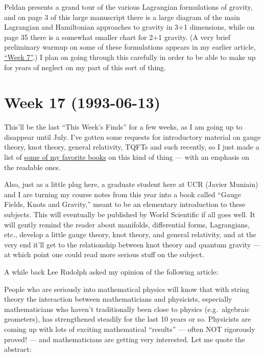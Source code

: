 \documentclass{article}
\def\tightlist{}
\renewcommand{\texttt}[1]{%
  \begingroup
  \ttfamily
  \begingroup\lccode`~=`/\lowercase{\endgroup\def~}{/\discretionary{}{}{}}%
  \begingroup\lccode`~=`[\lowercase{\endgroup\def~}{[\discretionary{}{}{}}%
  \begingroup\lccode`~=`.\lowercase{\endgroup\def~}{.\discretionary{}{}{}}%
  \catcode`/=\active\catcode`[=\active\catcode`.=\active
  \scantokens{#1\noexpand}%
  \endgroup
}
\begin{document}
Peldan presents a grand tour of the various Lagrangian formulations of
gravity, and on page 3 of this large manuscript there is a large diagram
of the main Lagrangian and Hamiltonian approaches to gravity in 3+1
dimensions, while on page 35 there is a somewhat smaller chart for 2+1
gravity. (A very brief preliminary warmup on some of these formulations
appears in my earlier article, \protect\hyperlink{week7}{``Week 7''}.) I
plan on going through this carefully in order to be able to make up for
years of neglect on my part of this sort of thing.
\hypertarget{week17}{%
\section{Week 17 (1993-06-13)}\label{week17}}

This'll be the last ``This Week's Finds'' for a few weeks, as I am going
up to disappear until July. I've gotten some requests for introductory
material on gauge theory, knot theory, general relativity, TQFTs and
such recently, so I just made a list of
\href{http://math.ucr.edu/home/baez/books.html}{some of my favorite
books} on this kind of thing --- with an emphasis on the readable ones.

Also, just as a little plug here, a graduate student here at UCR (Javier
Muniain) and I are turning my course notes from this year into a book
called ``Gauge Fields, Knots and Gravity,'' meant to be an elementary
introduction to these subjects. This will eventually be published by
World Scientific if all goes well. It will gently remind the reader
about manifolds, differential forms, Lagrangians, etc., develop a little
gauge theory, knot theory, and general relativity, and at the very end
it'll get to the relationship between knot theory and quantum gravity
--- at which point one could read more serious stuff on the subject.

A while back Lee Rudolph asked my opinion of the following article:


People who are seriously into mathematical physics will know that with
string theory the interaction between mathematicians and physicists,
especially mathematicians who haven't traditionally been close to
physics (e.g.~algebraic geometers), has strengthened steadily for the
last 10 years or so. Physicists are coming up with lots of exciting
mathematical ``results'' --- often NOT rigorously proved! --- and
mathematicians are getting very interested. Let me quote the abstract:
\end{document}

